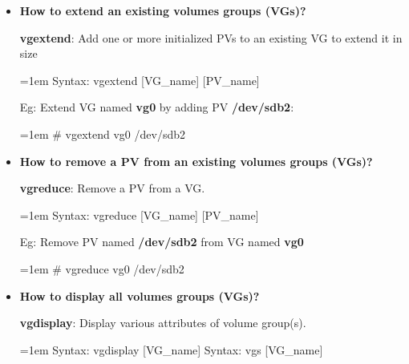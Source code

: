 \begin{flushleft}
	\bigskip
		\begin{itemize}
		
		\item 	\textbf{How to extend an existing volumes groups (VGs)?}
		
		\textbf{vgextend}: Add one or more initialized PVs to an existing VG to extend it in size
		\begin{tcolorbox}[breakable,notitle,boxrule=-0pt,colback=pink,colframe=pink]
			\color{black}
			\font=1em
			Syntax: vgextend [VG\_name] [PV\_name]
			\font=4pt
		\end{tcolorbox}
		
		Eg: Extend VG named \textbf{vg0} by adding PV \textbf{/dev/sdb2}:
		\begin{tcolorbox}[breakable,notitle,boxrule=-0pt,colback=black,colframe=black]
			\color{green}
			\font=1em
			\# vgextend vg0  /dev/sdb2
			\font=4pt
		\end{tcolorbox}
		
		\bigskip
		\bigskip


		\item 	\textbf{How to remove a PV from an existing volumes groups (VGs)?}

		\textbf{vgreduce}: Remove a PV from a VG.
		\begin{tcolorbox}[breakable,notitle,boxrule=-0pt,colback=pink,colframe=pink]
			\color{black}
			\font=1em
			Syntax: vgreduce [VG\_name] [PV\_name]
			\font=4pt
		\end{tcolorbox}
		
		Eg: Remove PV named \textbf{/dev/sdb2} from VG named \textbf{vg0}
		\begin{tcolorbox}[breakable,notitle,boxrule=-0pt,colback=black,colframe=black]
			\color{green}
			\font=1em
			\# vgreduce vg0  /dev/sdb2
			\font=4pt
		\end{tcolorbox}
		
		\newpage	
		\item 	\textbf{How to display all volumes groups (VGs)?}
		
		\textbf{vgdisplay}: Display various attributes of volume group(s).
		\begin{tcolorbox}[breakable,notitle,boxrule=-0pt,colback=pink,colframe=pink]
			\color{black}
			\font=1em
			Syntax: vgdisplay [VG\_name]
			\newline
			Syntax: vgs [VG\_name]
			\font=4pt
		\end{tcolorbox}
		 	

\end{itemize}
\end{flushleft}

